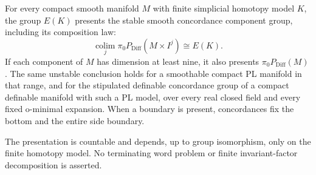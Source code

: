 \begin{theorem}\label{thm:countable-stable-smooth-components}
For every compact smooth manifold $M$ with finite simplicial homotopy
model $K$, the group $E(K)$ presents the stable smooth concordance
component group, including its composition law:
\[
 \operatorname*{colim}_j
 \pi_0P_{\mathrm{Diff}}(M\times I^j)\cong E(K).
\]
If each component of $M$ has dimension at least nine, it also presents
$\pi_0P_{\mathrm{Diff}}(M)$.  The same unstable conclusion holds for
a smoothable compact PL manifold in that range, and for the
stipulated definable concordance group of a compact definable manifold
with such a PL model, over every real closed field and every fixed
o-minimal expansion.  When a boundary is present, concordances fix the
bottom and the entire side boundary.

The presentation is countable and depends, up to group isomorphism,
only on the finite homotopy model.  No terminating word problem or
finite invariant-factor decomposition is asserted.
\end{theorem}

